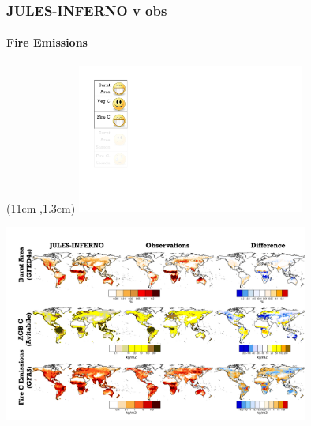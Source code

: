 \begin{frame}[label = kelley2013Datasets]
	\frametitle{JULES-INFERNO v obs}
	\framesubtitle{Fire Emissions}
	
	\begin{textblock*}{8cm}(11cm ,1.3cm)
		\includegraphics[width=7.5cm]{images/Smileys/BAvegCFireC.png}
	\end{textblock*}
	
	 {
		\includegraphics[width=10cm]{images/julesPerformance/FireMapsSpatial.png}
	}
\end{frame}


\addtocounter{framenumber}{-1}
\addtocounter{framenumber}{-1}



